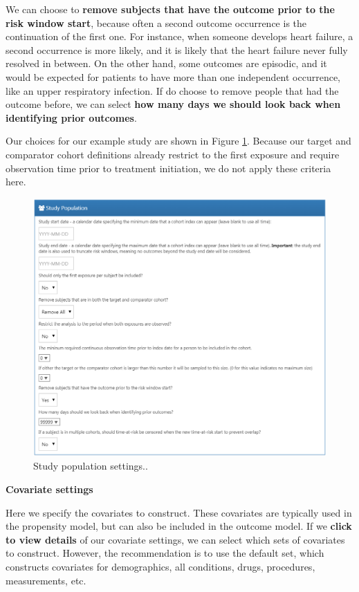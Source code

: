 \documentclass[]{book}
\begin{document}
We can choose to \textbf{remove subjects that have the outcome prior to
the risk window start}, because often a second outcome occurrence is the
continuation of the first one. For instance, when someone develops heart
failure, a second occurrence is more likely, and it is likely that the
heart failure never fully resolved in between. On the other hand, some
outcomes are episodic, and it would be expected for patients to have
more than one independent occurrence, like an upper respiratory
infection. If do choose to remove people that had the outcome before, we
can select \textbf{how many days we should look back when identifying
prior outcomes}.

Our choices for our example study are shown in Figure
\ref{fig:studyPopulation}. Because our target and comparator cohort
definitions already restrict to the first exposure and require
observation time prior to treatment initiation, we do not apply these
criteria here.

\begin{figure}

{\centering \includegraphics[width=1\linewidth]{images/PopulationLevelEstimation/studyPopulation} 

}

\caption{Study population settings..}\label{fig:studyPopulation}
\end{figure}

\textbf{Covariate settings}

Here we specify the covariates to construct. These covariates are
typically used in the propensity model, but can also be included in the
outcome model. If we \textbf{click to view details} of our covariate
settings, we can select which sets of covariates to construct. However,
the recommendation is to use the default set, which constructs
covariates for demographics, all conditions, drugs, procedures,
measurements, etc.
\end{document}
